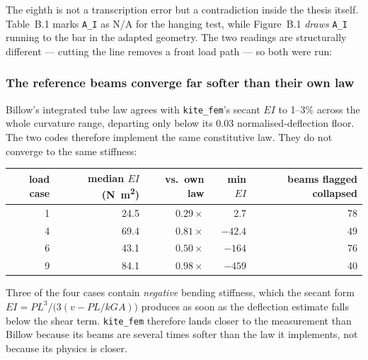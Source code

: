 \documentclass[11pt,a4paper]{article}
\begin{document}
The eighth is not a transcription error but a contradiction inside the thesis
itself. Table~B.1 marks \texttt{A\_I} as N/A for the hanging test, while
Figure~B.1 \emph{draws} \texttt{A\_I} running to the bar in the adapted
geometry. The two readings are structurally different --- cutting the line
removes a front load path --- so both were run:

\begin{table}[htbp]
\centering
\caption{Three readings of the same source. Cutting \texttt{A\_I} is the most
accurate reading on the cases the model can solve and the worst overall,
because removing that load path is what lets the four centre-load cases fall
into a folded local minimum. No reading is adopted here: the ambiguity is a
finding about the source data, not something to settle by taking whichever
scores best.}

\end{table}

\subsubsection{The reference beams converge far softer than their own law}

Billow's integrated tube law agrees with \texttt{kite\_fem}'s secant $EI$ to
1--3\% across the whole curvature range, departing only below its
\num{0.03} normalised-deflection floor. The two codes therefore implement the
same constitutive law. They do not converge to the same stiffness:

\begin{center}
\begin{tabular}{rrrrr}
\toprule
load case & median $EI$ (\si{N.m^2}) & vs.\ own law & min $EI$ & beams flagged collapsed \\
\midrule
1 & 24.5 & $0.29\times$ & 2.7 & 78 \\
4 & 69.4 & $0.81\times$ & $-42.4$ & 49 \\
6 & 43.1 & $0.50\times$ & $-164$ & 76 \\
9 & 84.1 & $0.98\times$ & $-459$ & 40 \\
\bottomrule
\end{tabular}
\end{center}

Three of the four cases contain \emph{negative} bending stiffness, which the
secant form $EI = PL^3/\bigl(3(v - PL/kGA)\bigr)$ produces as soon as the
deflection estimate falls below the shear term. \texttt{kite\_fem} therefore
lands closer to the measurement than Billow because its beams are several times
softer than the law it implements, not because its physics is closer.
\end{document}
